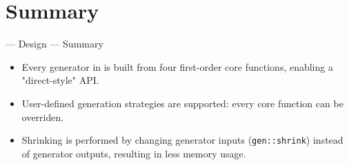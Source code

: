 \section{Summary}

\begin{frame}{\halcheck{} --- Design --- Summary}
  \begin{itemize}
    \item Every generator in \halcheck{} is built from four first-order core functions, enabling a "direct-style" API.
    \item User-defined generation strategies are supported: every core function can be overriden.
    \item Shrinking is performed by changing generator inputs (\texttt{gen::shrink}) instead of generator outputs, resulting in less memory usage.
  \end{itemize}
\end{frame}
